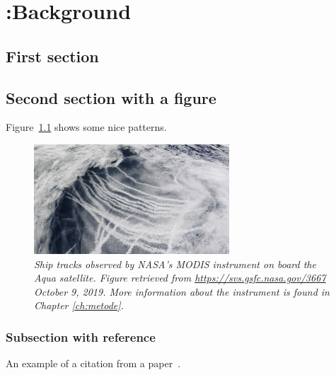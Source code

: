 \chapter[Background]{{\color{red} :}Background}
%
\label{ch:background}

\section{First section}\label{ch:forcefeed}

\kant[3]

\section{Second section with a figure}

Figure~\ref{fig:shiptracks} shows some nice patterns.

\begin{figure}
\centering
    \includegraphics[width=0.65\textwidth]{figures/ship_tracks.jpg}
\caption{\textit{Ship tracks observed by NASA's MODIS instrument on board the Aqua satellite. Figure retrieved from \url{https://svs.gsfc.nasa.gov/3667} October 9, 2019. More information about the instrument is found in Chapter \ref{ch:metode}.}}
\label{fig:shiptracks}
\end{figure}

\subsection{Subsection with reference}
\label{sec:ex:cite}

An example of a citation from a paper~\cite{glasius_composition_2018}.
